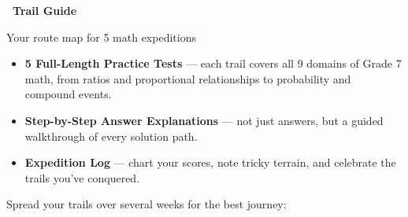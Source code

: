 
\thispagestyle{empty}

{
\sffamily

\begin{center}
    \textcolor{funTealDark}{\fontsize{26}{30}\selectfont\bfseries
    \faMap~Trail Guide~\faMap}

    \smallskip
    \textcolor{funGray}{\normalsize Your route map for 5 math expeditions}
\end{center}

\vspace{4mm}

\begin{tcolorbox}[
    enhanced,
    colback=funCream,
    colframe=funTeal!40,
    arc=10pt, boxrule=1pt,
    left=5mm, right=5mm, top=3mm, bottom=3mm,
    title={\textcolor{white}{\faMapMarkedAlt~What's in This Journal}},
    colbacktitle=funTealDark!75,
    fonttitle=\bfseries\sffamily,
]
    \small
    \begin{itemize}[leftmargin=*, itemsep=3pt]
        \item \textbf{5 Full-Length Practice Tests} --- each trail covers
            all 9 domains of Grade 7 math, from ratios and proportional
            relationships to probability and compound events.
        \item \textbf{Step-by-Step Answer Explanations} --- not just answers,
            but a guided walkthrough of every solution path.
        \item \textbf{Expedition Log} --- chart your scores, note tricky
            terrain, and celebrate the trails you've conquered.
    \end{itemize}
\end{tcolorbox}

\vspace{2mm}

\begin{tcolorbox}[
    enhanced,
    colback=funYellowLight,
    colframe=funYellowDark!50,
    arc=10pt, boxrule=1pt,
    left=5mm, right=5mm, top=3mm, bottom=3mm,
    title={\textcolor{white}{\faCalendarAlt~Your 5-Trail Itinerary}},
    colbacktitle=funYellowDark!65,
    fonttitle=\bfseries\sffamily,
]
    \small
    Spread your trails over several weeks for the best journey:


\end{tcolorbox}}
